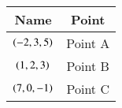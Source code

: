 \begin{tabular}[12pt]{ |c| c|}
    \hline
    \textbf{Name} & \textbf{Point}\\ 
    \hline
    $\left(-2,3,5\right)$ & Point A \\
    \hline 
    $\left(1,2,3\right)$ & Point B\\
    \hline
    $\left(7,0,-1\right)$ & Point C\\
    \hline
    \end{tabular}
